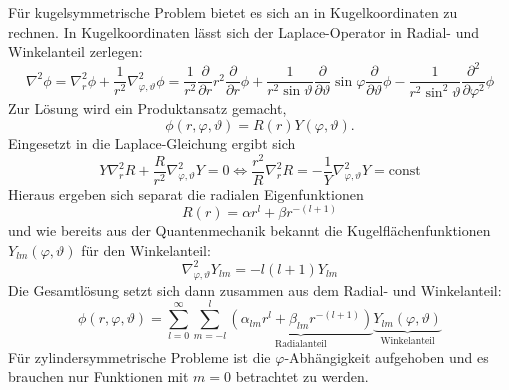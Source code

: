 Für kugelsymmetrische Problem bietet es sich an in Kugelkoordinaten zu rechnen. In Kugelkoordinaten lässt sich der Laplace-Operator in Radial- und Winkelanteil zerlegen:
\begin{equation*}
	\nabla ^{2}\phi =\nabla _{r}^{2}\phi +\frac{1}{r^{2}}\nabla _{\varphi ,\vartheta }^{2}\phi =\frac{1}{r^{2}}\frac{\partial }{\partial r}r^{2}\frac{\partial }{\partial r}\phi +\frac{1}{r^{2}\sin \vartheta }\frac{\partial }{\partial \vartheta }\sin \varphi \frac{\partial }{\partial \vartheta }\phi -\frac{1}{r^{2}\sin ^{2} \vartheta }\frac{\partial ^{2}}{\partial \varphi ^{2}}\phi
\end{equation*}
Zur Lösung wird ein Produktansatz gemacht,
\begin{equation*}
	\phi \left(r,\varphi ,\vartheta \right)=R\left(r\right)Y\left(\varphi ,\vartheta \right).
\end{equation*}
Eingesetzt in die Laplace-Gleichung ergibt sich
\begin{equation*}
	Y\nabla _{r}^{2}R+\frac{R}{r^{2}}\nabla _{\varphi ,\vartheta }^{2}Y=0\Leftrightarrow \frac{r^{2}}{R}\nabla _{r}^{2}R=-\frac{1}{Y}\nabla _{\varphi ,\vartheta }^{2}Y=\text{const}
\end{equation*}
Hieraus ergeben sich separat die radialen Eigenfunktionen
\begin{equation*}
	R\left(r\right)=\alpha r^{l}+\beta r^{-\left(l+1\right)}
\end{equation*}
und wie bereits aus der Quantenmechanik bekannt die Kugelflächenfunktionen $Y_{lm}\left(\varphi ,\vartheta \right)$ für den Winkelanteil:
\begin{equation*}
	\nabla _{\varphi ,\vartheta }^{2}Y_{lm}=-l\left(l+1\right)Y_{lm}
\end{equation*}
Die Gesamtlösung setzt sich dann zusammen aus dem Radial- und Winkelanteil:
\begin{equation*}
	\phi \left(r,\varphi ,\vartheta \right)=\sum _{l=0}^{\infty }\sum _{m=-l}^{l}\underset{\text{Radialanteil}}{\underbrace{\left(\alpha _{lm}r^{l}+\beta _{lm}r^{-\left(l+1\right)}\right)}}\underset{\text{Winkelanteil}}{\underbrace{Y_{lm}\left(\varphi ,\vartheta \right)}}
\end{equation*}
Für zylindersymmetrische Probleme ist die $\varphi $-Abhängigkeit aufgehoben und es brauchen nur Funktionen mit $m=0$ betrachtet zu werden.

